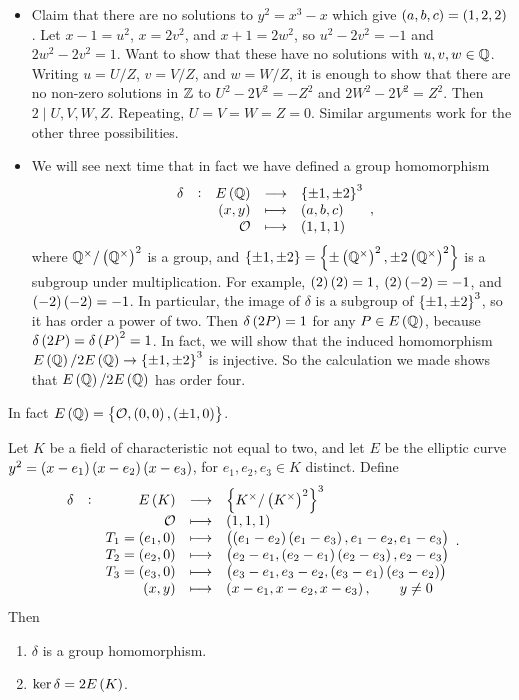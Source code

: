 \begin{example}
\begin{itemize}
\item Claim that there are no solutions to $ y^2 = x^3 - x $ which give $ \br{a, b, c} = \br{1, 2, 2} $. Let $ x - 1 = u^2 $, $ x = 2v^2 $, and $ x + 1 = 2w^2 $, so $ u^2 - 2v^2 = -1 $ and $ 2w^2 - 2v^2 = 1 $. Want to show that these have no solutions with $ u, v, w \in \mathbb{Q} $. Writing $ u = U / Z $, $ v = V / Z $, and $ w = W / Z $, it is enough to show that there are no non-zero solutions in $ \mathbb{Z} $ to $ U^2 - 2V^2 = -Z^2 $ and $ 2W^2 - 2V^2 = Z^2 $. Then $ 2 \mid U, V, W, Z $. Repeating, $ U = V = W = Z = 0 $. Similar arguments work for the other three possibilities.
\item We will see next time that in fact we have defined a group homomorphism
$$ \functions[\delta]{E\br{\QQ}}{\cbr{\pm 1, \pm 2}^3}{\br{x, y}}{\br{a, b, c}}{\OOO}{\br{1, 1, 1}}, $$
where $ \QQ^\times / \br{\QQ^\times}^2 $ is a group, and $ \cbr{\pm 1, \pm 2} = \cbr{\pm\br{\QQ^\times}^2, \pm2\br{\QQ^\times}^2} $ is a subgroup under multiplication. For example, $ \br{2}\br{2} = 1 $, $ \br{2}\br{-2} = -1 $, and $ \br{-2}\br{-2} = -1 $. In particular, the image of $ \delta $ is a subgroup of $ \cbr{\pm 1, \pm 2}^3 $, so it has order a power of two. Then $ \delta\br{2P} = 1 $ for any $ P \in E\br{\QQ} $, because $ \delta\br{2P} = \delta\br{P}^2 = 1 $. In fact, we will show that the induced homomorphism $ E\br{\QQ} / 2E\br{\QQ} \to \cbr{\pm 1, \pm 2}^3 $ is injective. So the calculation we made shows that $ E\br{\QQ} / 2E\br{\QQ} $ has order four.
\end{itemize}
In fact $ E\br{\QQ} = \cbr{\OOO, \br{0, 0}, \br{\pm 1, 0}} $.
\end{example}

\pagebreak


\begin{theorem}
\label{thm:9.2}
Let $ K $ be a field of characteristic not equal to two, and let $ E $ be the elliptic curve $ y^2 = \br{x - e_1}\br{x - e_2}\br{x - e_3} $, for $ e_1, e_2, e_3 \in K $ distinct. Define
$$
\begin{array}{ccrcl}
\delta & : & E\br{K} & \longrightarrow & \cbr{K^\times / \br{K^\times}^2}^3 \\
& & \OOO & \longmapsto & \br{1, 1, 1} \\
& & T_1 = \br{e_1, 0} & \longmapsto & \br{\br{e_1 - e_2}\br{e_1 - e_3}, e_1 - e_2, e_1 - e_3} \\
& & T_2 = \br{e_2, 0} & \longmapsto & \br{e_2 - e_1, \br{e_2 - e_1}\br{e_2 - e_3}, e_2 - e_3} \\
& & T_3 = \br{e_3, 0} & \longmapsto & \br{e_3 - e_1, e_3 - e_2, \br{e_3 - e_1}\br{e_3 - e_2}} \\
& & \br{x, y} & \longmapsto & \br{x - e_1, x - e_2, x - e_3}, \qquad y \ne 0
\end{array}.
$$
Then
\begin{enumerate}
\item $ \delta $ is a group homomorphism.
\item $ \ker \delta = 2E\br{K} $.
\end{enumerate}
\end{theorem}

